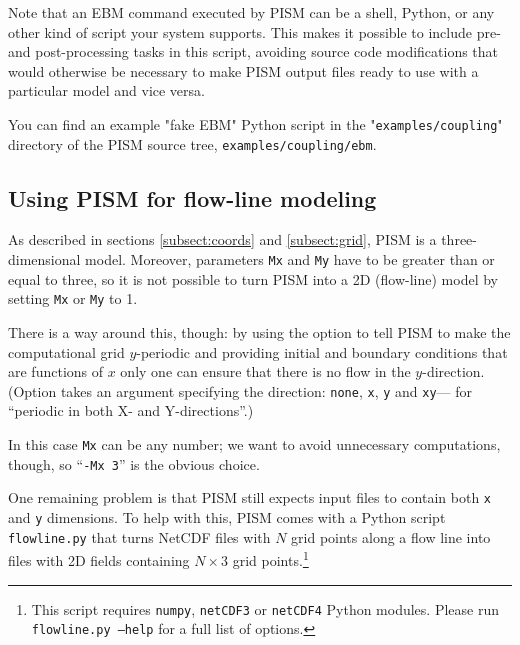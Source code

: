 Note that an EBM command executed by PISM can be a shell, Python, or any
other kind of script your system supports. This makes it possible to include
pre- and post-processing tasks in this script, avoiding source code
modifications that would otherwise be necessary to make PISM output files ready
to use with a particular model and vice versa.

You can find an example "fake EBM" Python script in the "\texttt{examples/coupling}"
directory of the PISM source tree, \texttt{examples/coupling/ebm}.

\subsection{Using PISM for flow-line modeling}
\label{sec:flowline-modeling}

As described in sections \ref{subsect:coords} and \ref{subsect:grid}, PISM is a
three-dimensional model. Moreover, parameters
\texttt{Mx} and \texttt{My} have to be greater than or equal to three, so it is
not possible to turn PISM into a 2D (flow-line) model by setting \texttt{Mx} or
\texttt{My} to 1.

There is a way around this, though: by using the 
option to tell PISM to make the computational grid $y$-periodic and providing
initial and boundary conditions that are functions of $x$ only one can ensure
that there is no flow in the $y$-direction. (Option 
takes an argument specifying the direction: \texttt{none}, \texttt{x},
\texttt{y} and \texttt{xy}--- for ``periodic in both X- and Y-directions''.)

In this case \texttt{Mx} can be any number; we want to avoid unnecessary
computations, though, so ``\texttt{-Mx 3}'' is the obvious choice.

One remaining problem is that PISM still expects input files to contain both
\texttt{x} and \texttt{y} dimensions. To help with this, PISM comes with a
Python script \texttt{flowline.py} that turns NetCDF files with $N$ grid points
along a flow line into files with 2D fields containing $N\times3$ grid
points.\footnote{This script requires \texttt{numpy}, \texttt{netCDF3} or
  \texttt{netCDF4} Python modules. Please run \texttt{flowline.py --help} for a
  full list of options.}

